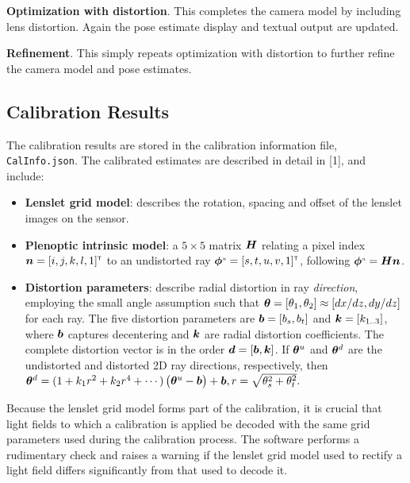 \documentclass[onecolumn]{article}
\newcommand{\SymbolText}[1]{\texttt{\small #1}}
\begin{document}
\textbf{Optimization with distortion}. This completes the camera model by including lens distortion.  Again the pose estimate display and textual output are updated.
 
\textbf{Refinement}.  This simply repeats optimization with distortion to further refine the camera model and pose estimates.

\subsection{Calibration Results}

The calibration results are stored in the calibration information file, \SymbolText{CalInfo.json}. The calibrated estimates are described in detail in [1], and include:

\begin{itemize}

\item \textbf{Lenslet grid model}: describes the rotation, spacing and offset of the lenslet images on the sensor.

\item \textbf{Plenoptic intrinsic model}: a $5 \times 5$ matrix $\mat{H}$ relating a pixel index $\bm{n} = [i,j,k,l,1]^{\scriptscriptstyle\mathsf{T}}$ to an undistorted ray $\bm{\phi}^{\scriptscriptstyle\mathit{u}} = [s,t,u,v,1]^{\scriptscriptstyle\mathsf{T}}$, following $\vect{\phi}\super{u} = \mat{H} \vect{n}$.

\item \textbf{Distortion parameters}: describe radial distortion in ray \emph{direction}, employing the small angle assumption such that $\bm{\theta} = [\theta_1, \theta_2] \approx [dx/dz, dy/dz]$ for each ray. The five distortion parameters are $\bm{b} = [b_s,b_t]$ and $\bm{k} = [k_{1..3}]$, where $\bm{b}$ captures decentering and $\bm{k}$ are radial distortion coefficients.  The complete distortion vector is in the order $\bm{d} = [\bm{b}, \bm{k}]$. If $\bm{\theta}^u$ and $\bm{\theta}^d$ are the undistorted and distorted 2D ray directions, respectively, then\\ 
$
\bm{\theta}^d =
(1 + k_1 r^2 + k_2 r^4 + \cdots)
\begin{pmatrix}
\bm{\theta}^u
-
\bm{b}
\end{pmatrix}
+
\bm{b},
r = \sqrt{\theta_s^2 + \theta_t^2}.
$
 
\end{itemize}

Because the lenslet grid model forms part of the calibration, it is crucial that light fields to which a calibration is applied be decoded with the same grid parameters used during the calibration process. The software performs a rudimentary check and raises a warning if the lenslet grid model used to rectify a light field differs significantly from that used to decode it.
\end{document}
